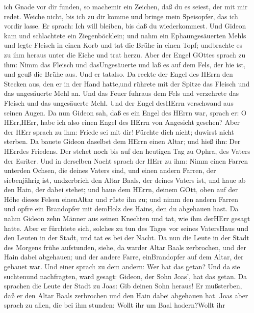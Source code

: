 ich Gnade vor dir funden, so machemir ein Zeichen, daß du es seiest, der
mit mir redet.  Weiche nicht, bis ich zu dir komme und
bringe mein Speisopfer, das ich vordir lasse. Er sprach: Ich will
bleiben, bis daß du wiederkommest.  Und Gideon kam und
schlachtete ein Ziegenböcklein; und nahm ein Ephaungesäuerten Mehls und
legte Fleisch in einen Korb und tat die Brühe in einen Topf; undbrachte
es zu ihm heraus unter die Eiche und trat herzu.  Aber der
Engel GOttes sprach zu ihm: Nimm das Fleisch und dasUngesäuerte und laß
es auf dem Fels, der hie ist, und geuß die Brühe aus. Und er tatalso.
 Da reckte der Engel des HErrn den Stecken aus, den er in
der Hand hatte,und rührete mit der Spitze das Fleisch und das
ungesäuerte Mehl an. Und das Feuer fuhraus dem Fels und verzehrete das
Fleisch und das ungesäuerte Mehl. Und der Engel desHErrn verschwand aus
seinen Augen.  Da nun Gideon sah, daß es ein Engel des
HErrn war, sprach er: O HErr,HErr, habe ich also einen Engel des HErrn
von Angesicht gesehen?  Aber der HErr sprach zu ihm: Friede
sei mit dir! Fürchte dich nicht; duwirst nicht sterben.  Da
bauete Gideon daselbst dem HErrn einen Altar; und hieß ihn: Der HErrdes
Friedens. Der stehet noch bis auf den heutigen Tag zu Ophra, des Vaters
der Esriter.  Und in derselben Nacht sprach der HErr zu
ihm: Nimm einen Farren unterden Ochsen, die deines Vaters sind, und
einen andern Farren, der siebenjährig ist, undzerbrich den Altar Baals,
der deines Vaters ist, und haue ab den Hain, der dabei stehet;
 und baue dem HErrn, deinem GOtt, oben auf der Höhe dieses
Felsen einenAltar und rüste ihn zu; und nimm den andern Farren und opfre
ein Brandopfer mit demHolz des Hains, den du abgehauen hast.
 Da nahm Gideon zehn Männer aus seinen Knechten und tat,
wie ihm derHErr gesagt hatte. Aber er fürchtete sich, solches zu tun des
Tages vor seines VatersHaus und den Leuten in der Stadt, und tat es bei
der Nacht.  Da nun die Leute in der Stadt des Morgens frühe
aufstunden, siehe, da warder Altar Baals zerbrochen, und der Hain dabei
abgehauen; und der andere Farre, einBrandopfer auf dem Altar, der
gebauet war.  Und einer sprach zu dem andern: Wer hat das
getan? Und da sie suchtenund nachfragten, ward gesagt: Gideon, der Sohn
Joas', hat das getan.  Da sprachen die Leute der Stadt zu
Joas: Gib deinen Sohn heraus! Er mußsterben, daß er den Altar Baals
zerbrochen und den Hain dabei abgehauen hat.  Joas aber
sprach zu allen, die bei ihm stunden: Wollt ihr um Baal hadern?Wollt ihr
